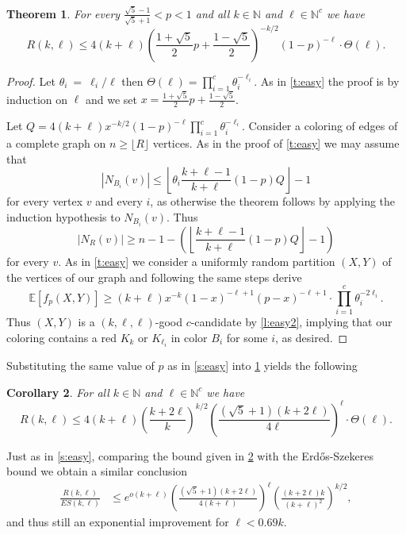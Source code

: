 \documentclass[reqno,final,12pt]{amsart}
\newtheorem{thm}{Theorem}
\newtheorem{cor}[thm]{Corollary}
\newcommand{\bb}[1]{\mathbb{#1}}
\newcommand{\bl}[1]{\boldsymbol{#1}}
\newcommand{\fs}[2]{\left(\frac{#1}{#2}\right)}
\newcommand{\s}[1]{\left(#1\right)}
\begin{document}
\begin{thm}\label{t:easy2}
	For every $\frac{\sqrt{5}-1}{\sqrt{5}+1}< p <1$ and all $k \in \bb{N}$ and  $\bl{\ell} \in \bb{N}^c$ we have $$R(k,\bl{\ell}) \leq 4(k+\ell)\s{\frac{1+\sqrt{5}}{2}p+\frac{1-\sqrt{5}}{2}}^{-k/2}(1-p)^{-\ell} \cdot \Theta(\bl{\ell}).$$
\end{thm}
\begin{proof} Let $\theta_i~=~\ell_i/\ell$ then $\Theta(\bl{\ell}) = \prod_{i=1}^c \theta_i^{-\ell_i}$. As in \cref{t:easy} the proof is by induction on $\ell$ and we set 
$x = \frac{1+\sqrt{5}}{2}p+\frac{1-\sqrt{5}}{2}$.

Let $Q=4(k+\ell)x^{-k/2}(1-p)^{-\ell}  \prod_{i=1}^c \theta_i^{-\ell_i}$.
Consider a  coloring of edges of a complete graph on $n \geq \lfloor R  \rfloor$ vertices.  As in the proof of \cref{t:easy}  we may assume that $$|N_{B_i}(v)|\leq  \left \lfloor \theta_i\frac{k+\ell-1}{k+\ell}(1-p)Q \right \rfloor - 1$$ for every vertex $v$ and every $i$, as otherwise the theorem follows by applying the induction hypothesis to $N_{B_i}(v)$. Thus $$|N_R(v)| \geq n-1 - \s{\left \lfloor \frac{k+\ell-1}{k+\ell}(1-p)Q \right\rfloor- 1}$$ for every $v$. As in \cref{t:easy}  we consider a uniformly random partition $(X,Y)$ of the vertices of our graph and following the same steps derive
	$$\bb{E}[f_p(X,Y)] \geq (k+\ell)x^{-k}(1-x)^{-\ell+1}(p-x)^{-\ell+1}\cdot \prod_{i=1}^c\theta_i^{-2\ell_i} .
	$$ Thus $(X,Y)$ is a $(k,\bl{\ell},\bl{\ell})$-good $c$-candidate by \cref{l:easy2}, implying that  our  coloring contains a red $K_k$ or $K_{\ell_i}$ in color $B_i$ for some $i$, as desired.
\end{proof}	

Substituting the same value of $p$ as in \cref{s:easy} into \cref{t:easy2}   yields the following
\begin{cor}\label{c:easy2}
	For all $k \in \bb{N}$ and  $\bl{\ell} \in \bb{N}^c$ we have $$R(k,\bl{\ell}) \leq 4(k+\ell)\s{\frac{k+2 \ell}{k}}^{k/2}\fs{\left(\sqrt{5}+1\right) (k+2 \ell)}{4\ell}^{\ell}\cdot \Theta(\bl{\ell}).$$
\end{cor}

Just as   in \cref{s:easy}, comparing the bound given in \cref{c:easy2} with the Erd\H{o}s-Szekeres bound we obtain a similar  conclusion
\begin{align*} \frac{R(k,\bl{\ell})}{ES(k,\bl{\ell})} &\leq e^{o(k+\ell)} \fs{(\sqrt{5}+1)(k+2\ell)}{4(k+\ell)}^{\ell}\fs{(k+2\ell)k}{(k+\ell)^2}^{k/2}, 
\end{align*}
and thus still an exponential improvement for $\ell < 0.69 k$. 
\end{document}
